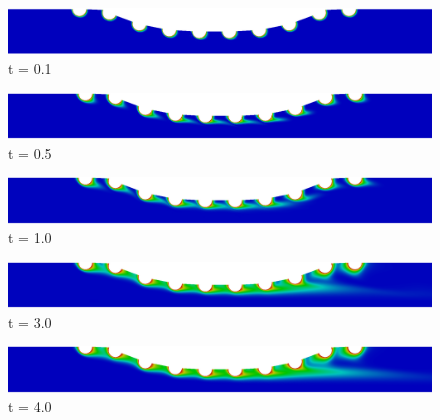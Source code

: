 \bigskip
\begin{figure}[H]
     \begin{minipage}{.50\linewidth}
      \centering
      \includegraphics[scale=0.12]{./02_chaps/cap_solution/figure/conc10_CurvedStrut500.png}\\
      t = 0.1
     \end{minipage}%
     \begin{minipage}{.50\linewidth}
      \centering
      \includegraphics[scale=0.12]{./02_chaps/cap_solution/figure/conc10_CurvedStrut2500.png}\\
      t = 0.5
     \end{minipage}
     \begin{minipage}{.50\linewidth}
     \medskip
      \centering
      \includegraphics[scale=0.12]{./02_chaps/cap_solution/figure/conc10_CurvedStrut5000.png}\\
      t = 1.0
     \end{minipage}%
     \begin{minipage}{.50\linewidth}
     \medskip
      \centering
      \includegraphics[scale=0.12]{./02_chaps/cap_solution/figure/conc10_CurvedStrut15000.png}\\
      t = 3.0
     \end{minipage}
     \begin{minipage}{.50\linewidth}
      \centering
      \includegraphics[scale=0.12]{./02_chaps/cap_solution/figure/conc10_CurvedStrut20000.png}\\
      t = 4.0
     \end{minipage}%

\end{figure}
